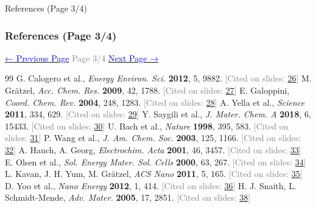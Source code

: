 \documentclass[aspectratio=169]{beamer}
\begin{document}
\begin{frame}[allowframebreaks]{References (Page 3/4)}
\frametitle{References (Page 3/4)}
\vspace{0.5em}\begin{center}\hyperlink{page.2}{\textcolor{blue}{\small ← Previous Page}} \hfill \textcolor{gray}{\small Page 3/4} \hfill \hyperlink{page.4}{\textcolor{blue}{\small Next Page →}}\end{center}

\begin{thebibliography}{99}
 G. Calogero et al., \textit{Energy Environ. Sci.} \textbf{2012}, 5, 9882. \hfill\textcolor{gray}{\tiny [Cited on slides: \hyperlink{page.26}{26}]}
 M. Grätzel, \textit{Acc. Chem. Res.} \textbf{2009}, 42, 1788. \hfill\textcolor{gray}{\tiny [Cited on slides: \hyperlink{page.27}{27}]}
 E. Galoppini, \textit{Coord. Chem. Rev.} \textbf{2004}, 248, 1283. \hfill\textcolor{gray}{\tiny [Cited on slides: \hyperlink{page.28}{28}]}
 A. Yella et al., \textit{Science} \textbf{2011}, 334, 629. \hfill\textcolor{gray}{\tiny [Cited on slides: \hyperlink{page.29}{29}]}
 Y. Saygili et al., \textit{J. Mater. Chem. A} \textbf{2018}, 6, 15433. \hfill\textcolor{gray}{\tiny [Cited on slides: \hyperlink{page.30}{30}]}
 U. Bach et al., \textit{Nature} \textbf{1998}, 395, 583. \hfill\textcolor{gray}{\tiny [Cited on slides: \hyperlink{page.31}{31}]}
 P. Wang et al., \textit{J. Am. Chem. Soc.} \textbf{2003}, 125, 1166. \hfill\textcolor{gray}{\tiny [Cited on slides: \hyperlink{page.32}{32}]}
 A. Hauch, A. Georg, \textit{Electrochim. Acta} \textbf{2001}, 46, 3457. \hfill\textcolor{gray}{\tiny [Cited on slides: \hyperlink{page.33}{33}]}
 E. Olsen et al., \textit{Sol. Energy Mater. Sol. Cells} \textbf{2000}, 63, 267. \hfill\textcolor{gray}{\tiny [Cited on slides: \hyperlink{page.34}{34}]}
 L. Kavan, J. H. Yum, M. Grätzel, \textit{ACS Nano} \textbf{2011}, 5, 165. \hfill\textcolor{gray}{\tiny [Cited on slides: \hyperlink{page.35}{35}]}
 D. Yoo et al., \textit{Nano Energy} \textbf{2012}, 1, 414. \hfill\textcolor{gray}{\tiny [Cited on slides: \hyperlink{page.36}{36}]}
 H. J. Snaith, L. Schmidt-Mende, \textit{Adv. Mater.} \textbf{2005}, 17, 2851. \hfill\textcolor{gray}{\tiny [Cited on slides: \hyperlink{page.38}{38}]}
\end{thebibliography}
\end{frame}
\end{document}
